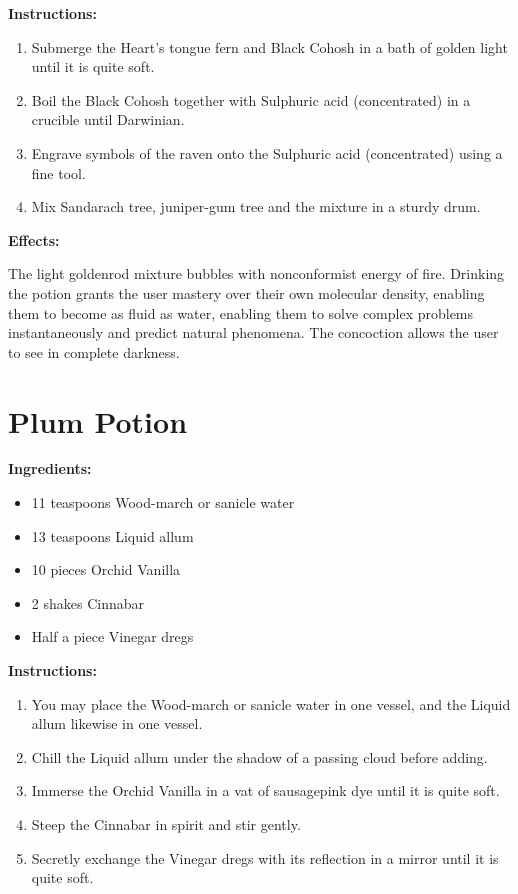 \documentclass{article}
\begin{document}
\textbf{Instructions:}

\begin{enumerate}
  \item Submerge the Heart's tongue fern and Black Cohosh in a bath of golden light until it is quite soft.
  \item Boil the Black Cohosh together with Sulphuric acid (concentrated) in a crucible until Darwinian.
  \item Engrave symbols of the raven onto the Sulphuric acid (concentrated) using a fine tool.
  \item Mix Sandarach tree, juniper-gum tree and the mixture in a sturdy drum.
\end{enumerate}

\textbf{Effects:}

The light goldenrod mixture bubbles with nonconformist energy of fire. Drinking the potion grants the user mastery over their own molecular density, enabling them to become as fluid as water, enabling them to solve complex problems instantaneously and predict natural phenomena. The concoction allows the user to see in complete darkness.

\newpage
\section*{Plum Potion}

\textbf{Ingredients:}

\begin{itemize}
  \item 11 teaspoons Wood-march or sanicle water
  \item 13 teaspoons Liquid allum
  \item 10 pieces Orchid Vanilla
  \item 2 shakes Cinnabar
  \item Half a piece Vinegar dregs
\end{itemize}

\textbf{Instructions:}

\begin{enumerate}
  \item You may place the Wood-march or sanicle water in one vessel, and the Liquid allum likewise in one vessel.
  \item Chill the Liquid allum under the shadow of a passing cloud before adding.
  \item Immerse the Orchid Vanilla in a vat of sausagepink dye until it is quite soft.
  \item Steep the Cinnabar in spirit and stir gently.
  \item Secretly exchange the Vinegar dregs with its reflection in a mirror until it is quite soft.
\end{enumerate}
\end{document}
